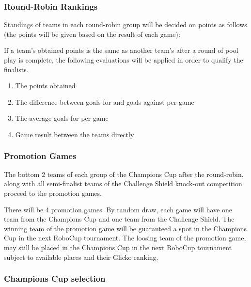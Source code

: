 \subsubsection{Round-Robin Rankings}
\label{sec:round-robin-rankings}

Standings of teams in each round-robin group will be decided on points as follows (the points will be given based on the result of each game):


If a team's obtained points is the same as another team's after a round of pool play is complete, the following evaluations will be applied in order to qualify the finalists.
\begin{enumerate}

\item The points obtained

\item The difference between goals for and goals against per game

\item The average goals for per game

\item Game result between the teams directly

\end{enumerate}

\subsubsection{Promotion Games}

The bottom 2 teams of each group of the Champions Cup after the round-robin, along with all semi-finalist teams of the Challenge Shield knock-out competition proceed to the promotion games.

There will be 4 promotion games. By random draw, each game will have one team from the Champions Cup and one team from the Challenge Shield. The winning team of the promotion game will be guaranteed a spot in the Champions Cup in the next RoboCup tournament. The loosing team of the promotion game, may still be placed in the Champions Cup in the next RoboCup tournament subject to available places and their Glicko ranking.


\subsubsection{Champions Cup selection}

